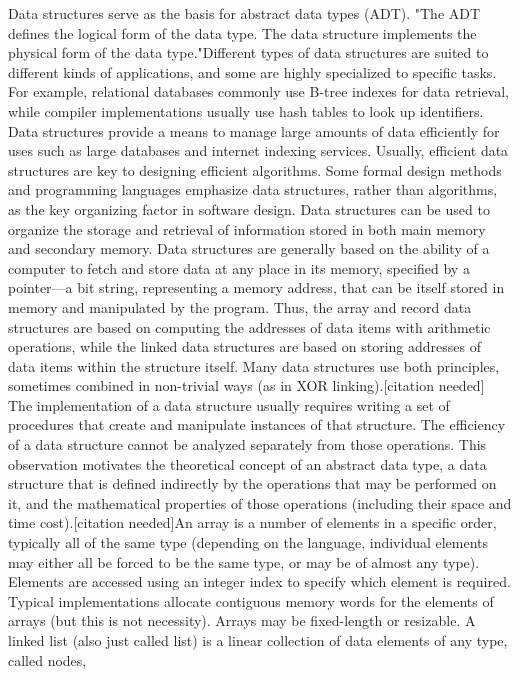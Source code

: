 \documentclass{article}
\begin{document}
\begin{}
Data structures serve as the basis for abstract data
types (ADT). "The ADT defines the logical form of
the data type. The data structure implements the
physical form of the data type."Different types of data
structures are suited to different kinds of applications,
and some are highly specialized to specific tasks. For
example, relational databases commonly use B-tree
indexes for data retrieval, while compiler
implementations usually use hash tables to look up
identifiers. Data structures provide a means to manage
large amounts of data efficiently for uses such as large
databases and internet indexing services. Usually,
efficient data structures are key to designing efficient
algorithms. Some formal design methods and
programming languages emphasize data structures,
rather than algorithms, as the key organizing factor in
software design. Data structures can be used to
organize the storage and retrieval of information
stored in both main memory and secondary memory.
Data structures are generally based on the ability of a
computer to fetch and store data at any place in its
memory, specified by a pointer—a bit string,
representing a memory address, that can be itself
stored in memory and manipulated by the program.
Thus, the array and record data structures are based on
computing the addresses of data items with arithmetic
operations, while the linked data structures are based
on storing addresses of data items within the structure
itself. Many data structures use both principles,
sometimes combined in non-trivial ways (as in XOR
linking).[citation needed]
The implementation of a data structure usually
requires writing a set of procedures that create and
manipulate instances of that structure. The efficiency
of a data structure cannot be analyzed separately from
those operations. This observation motivates the
theoretical concept of an abstract data type, a data
structure that is defined indirectly by the operations
that may be performed on it, and the mathematical
properties of those operations (including their space
and time cost).[citation needed]An array is a number
of elements in a specific order, typically all of the
same type (depending on the language, individual
elements may either all be forced to be the same type,
or may be of almost any type). Elements are accessed
using an integer index to specify which element is
required. Typical implementations allocate contiguous
memory words for the elements of arrays (but this is
not necessity). Arrays may be fixed-length or
resizable. A linked list (also just called list) is a linear
collection of data elements of any type, called nodes,

\end{}
\end{document}
